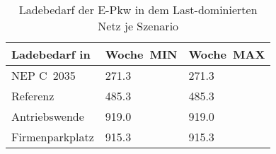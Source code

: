 {
\renewcommand{\arraystretch}{1.2}%
\begin{table}[H]
	\begin{center}
		\caption{Ladebedarf der E-Pkw in dem Last-dominierten Netz je Szenario}
		\begin{tabu} to 0.6\textwidth {X[1.5] X[1, r] X[1, r]}
			\toprule
			Ladebedarf in   \si{\mwh}    & Woche~MIN     & Woche~MAX     \\ \midrule
			NEP C~\num{2035}             & \num{271.3} & \num{271.3} \\
			Referenz                     & \num{485.3} & \num{485.3} \\
			Antriebswende                & \num{919.0} & \num{919.0} \\
			\glqq Firmenparkplatz\grqq{} & \num{915.3} & \num{915.3} \\ \bottomrule
		\end{tabu}
		\label{tab:load_dominated_epkw_demand}
	\end{center}
	\vspace{-3mm}%
\end{table}
}